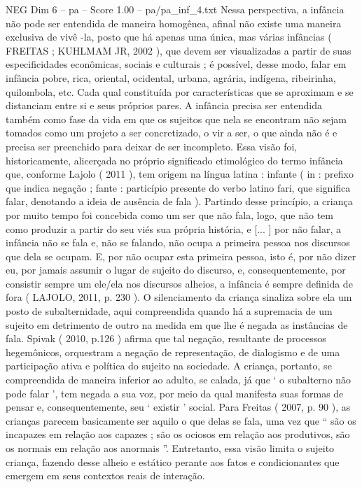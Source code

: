 \begin{textsample}{NEG Dim 6 – pa – Score 1.00 – pa/pa\_inf\_4.txt}
Nessa perspectiva, a infância não pode ser entendida de maneira homogênea, afinal não existe uma maneira exclusiva de vivê -la, posto que há apenas uma única, mas várias infâncias ( FREITAS ; KUHLMAM JR, 2002 ), que devem ser visualizadas a partir de suas especificidades econômicas, sociais e culturais ; é possível, desse modo, falar em infância pobre, rica, oriental, ocidental, urbana, agrária, indígena, ribeirinha, quilombola, etc.
Cada qual constituída por características que se aproximam e se distanciam entre si e seus próprios pares.
A infância precisa ser entendida também como fase da vida em que os sujeitos que nela se encontram não sejam tomados como um projeto a ser concretizado, o vir a ser, o que ainda não é e precisa ser preenchido para deixar de ser incompleto.
Essa visão foi, historicamente, alicerçada no próprio significado etimológico do termo infância que, conforme Lajolo ( 2011 ), tem origem na língua latina : infante ( in : prefixo que indica negação ; fante : particípio presente do verbo latino fari, que significa falar, denotando a ideia de ausência de fala ).
Partindo desse princípio, a criança por muito tempo foi concebida como um ser que não fala, logo, que não tem como produzir a partir do seu viés sua própria história, e [... ] por não falar, a infância não se fala e, não se falando, não ocupa a primeira pessoa nos discursos que dela se ocupam.
E, por não ocupar esta primeira pessoa, isto é, por não dizer eu, por jamais assumir o lugar de sujeito do discurso, e, consequentemente, por consistir sempre um ele/ela nos discursos alheios, a infância é sempre definida de fora ( LAJOLO, 2011, p. 230 ).
O silenciamento da criança sinaliza sobre ela um posto de subalternidade, aqui compreendida quando há a supremacia de um sujeito em detrimento de outro na medida em que lhe é negada as instâncias de fala.
Spivak ( 2010, p.126 ) afirma que tal negação, resultante de processos hegemônicos, orquestram a negação de representação, de dialogismo e de uma participação ativa e política do sujeito na sociedade.
A criança, portanto, se compreendida de maneira inferior ao adulto, se calada, já que ‘ o subalterno não pode falar ’, tem negada a sua voz, por meio da qual manifesta suas formas de pensar e, consequentemente, seu ‘ existir ’ social.
Para Freitas ( 2007, p. 90 ), as crianças parecem basicamente ser aquilo o que delas se fala, uma vez que “ são os incapazes em relação aos capazes ; são os ociosos em relação aos produtivos, são os normais em relação aos anormais ”.
Entretanto, essa visão limita o sujeito criança, fazendo desse alheio e estático perante aos fatos e condicionantes que emergem em seus contextos reais de interação.

\end{textsample}
